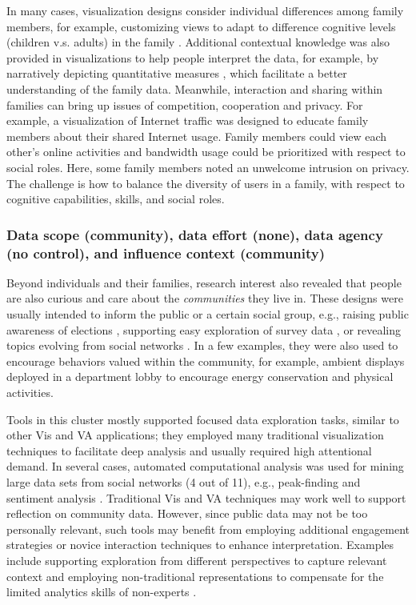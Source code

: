\documentclass[12pt,oneside]{book}
\begin{document}
In many cases, visualization designs consider individual differences among family members, for example, customizing views to adapt to difference cognitive levels (children v.s. adults) in the family \cite{froehlich_design_2012}. 
Additional contextual knowledge was also provided in visualizations to help people interpret the data, for example, by narratively depicting quantitative measures \cite{froehlich_design_2012}, which facilitate a better understanding of the family data.
Meanwhile, interaction and sharing within families can bring up issues of competition, cooperation and privacy. For example, a visualization of Internet traffic \cite{chetty_why_2011} was designed to educate family members about their shared Internet usage. Family members could view each other's online activities and bandwidth usage could be prioritized with respect to social roles. Here, some family members noted an unwelcome intrusion on privacy. The challenge is how to balance the diversity of users in a family, with respect to cognitive capabilities, skills, and social roles.

\subsubsection{Data scope (community), data effort (none), data agency (no control), and influence context (community)}
Beyond individuals and their families, research interest also revealed that people are also curious and care about the \textit{communities} they live in.
These designs were usually intended to inform the public or a certain social group, e.g., raising public awareness of elections \cite{wood_ballotmaps:_2011}, supporting easy exploration of survey data \cite{draper_who_2008}, or revealing topics evolving from social networks \cite{dork_visual_2010,faridani_opinion_2010}.  In a few examples, they were also used to encourage behaviors valued within the community, for example, ambient displays deployed in a department lobby to encourage energy conservation and physical activities\cite{hazlewood_issues_2011}.

Tools in this cluster mostly supported focused data exploration tasks, similar to other Vis and VA applications; they employed many traditional visualization techniques to facilitate deep analysis and usually required high attentional demand.  In several cases, automated computational analysis was used for mining large data sets from social networks (4 out of 11), e.g., peak-finding \cite{marcus_twitinfo:_2011} and sentiment analysis \cite{dork_visual_2010}.  Traditional Vis and VA techniques may work well to support reflection on community data.  However, since public data may not be too personally relevant, such tools may benefit from employing additional engagement strategies or novice interaction techniques to enhance interpretation.  Examples include supporting exploration from different perspectives to capture relevant context \cite{shen_mobivis:_2008} and employing non-traditional representations to compensate for the limited analytics skills of non-experts \cite{draper_who_2008}.
\end{document}
